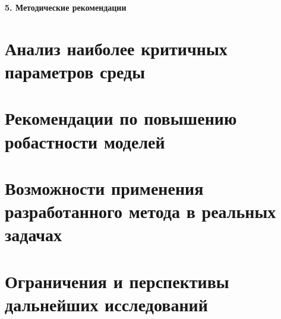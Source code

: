 \newpage
\begin{center}
  \textbf{\large 5. Методические рекомендации}
\end{center}

\section{Анализ наиболее критичных параметров среды}
\section{Рекомендации по повышению робастности моделей}
\section{Возможности применения разработанного метода в реальных задачах}
\section{Ограничения и перспективы дальнейших исследований}